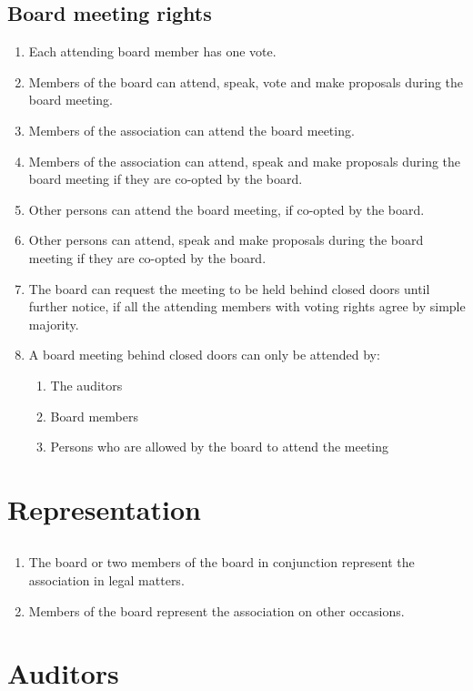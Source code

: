 \subsection{Board meeting rights}
\begin{enumerate}
  \item Each attending board member has one vote.
  \item Members of the board can attend, speak, vote and make proposals during the board meeting.
  \item Members of the association can attend the board meeting.
  \item Members of the association can attend, speak and make proposals during the board meeting if they are co-opted by the board.
  \item Other persons can attend the board meeting, if co-opted by the board.
  \item Other persons can attend, speak and make proposals during the board meeting if they are co-opted by the board.
  \item The board can request the meeting to be held behind closed doors until further notice, if all the attending members with voting rights agree by simple majority.
  \item A board meeting behind closed doors can only be attended by: 
  \begin{enumerate}
    \item The auditors 
    \item Board members 
    \item Persons who are allowed by the board to attend the meeting
  \end{enumerate}
\end{enumerate}

\section*{Representation}
\subsection{}
\begin{enumerate}
  \item The board or two members of the board in conjunction represent the association in legal matters.
  \item Members of the board represent the association on other occasions.
\end{enumerate}

\section*{Auditors}
